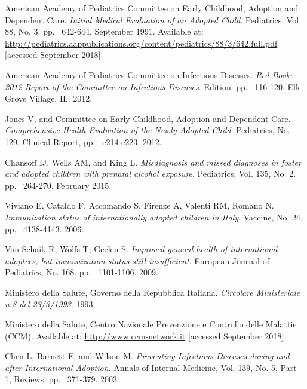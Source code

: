 \begin{thebibliography}{50}
  American Academy of Pediatrics Committee on Early Childhood, Adoption and Dependent Care.
  \textit{Initial Medical Evaluation of an Adopted Child}.
  Pediatrics. Vol 88, No. 3.
  pp. ~642-644.
  September 1991.
  Available at: \url{http://pediatrics.aappublications.org/content/pediatrics/88/3/642.full.pdf} [accessed September 2018]
  
  American Academy of Pediatrics Committee on Infectious Diseases.
  \textit{Red Book: 2012 Report of the Committee on Infectious Diseases}.
   Edition.
  pp. ~116-120.
  Elk Grove Village, IL.
  2012.

  Jones V, and Committee on Early Childhood, Adoption and Dependent Care.
  \textit{Comprehensive Health Evaluation of the Newly Adopted Child}.
  Pediatrics, No. 129.
  Clinical Report,
  pp. ~e214-e223.
  2012.

  Chansoff IJ, Wells AM, and King L.
  \textit{Misdiagnosis and missed diagnoses in foster and adopted children with prenatal alcohol exposure}.
  Pediatrics, Vol. 135, No. 2.
  pp. ~264-270.
  February 2015.

  Viviano E, Cataldo F, Accomando S, Firenze A, Valenti RM, Romano N.
  \textit{Immunization status of internationally adopted children in Italy}.
  Vaccine, No. 24.
  pp. ~4138-4143.
  2006.
  
  Van Schaik R, Wolfs T, Geelen S.
  \textit{Improved general health of international adoptees, but immunization status still insufficient}.
  European Journal of Pediatrics, No. 168.
  pp. ~1101-1106.
  2009.
  
  Ministero della Salute, Governo della Repubblica Italiana.
  \textit{Circolare Ministeriale n.8 del 23/3/1993}.
  1993.

  Ministero della Salute, Centro Nazionale Prevenzione e Controllo delle Malattie (CCM).  
  Available at: \url{http://www.ccm-network.it} [accessed September 2018]
  
  Chen L, Barnett E, and Wilson M.
  \textit{Preventing Infectious Diseases during and after International Adoption}.
  Annals of Internal Medicine, Vol. 139, No. 5, Part 1,
  Reviews,
  pp. ~371-379.
  2003.
  

\end{thebibliography}
